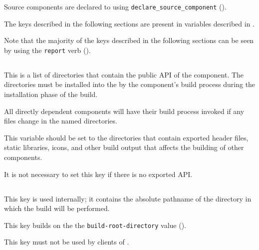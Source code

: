 Source components are declared to \lmsbw using
\texttt{declare\_source\_component}
().

The keys described in the following sections are present in variables
described in .

Note that the majority of the keys described in the following sections
can be seen by using the \texttt{report} verb
().


\subsection{}\label{variables:api}

This is a list of directories that contain the public API of the
component.  The directories must be installed into the \destdir by the
component's build process during the installation phase of the build.

All directly dependent components will have their build process
invoked if any files change in the named directories.

This variable should be set to the directories that contain exported
header files, static libraries, icons, and other build output that
affects the building of other components.

It is not necessary to set this key if there is no exported API.


\subsection{}\label{variables:build-directory}

This key is used internally; it contains the absolute pathname of the
directory in which the build will be performed.

This key builds on the the \texttt{build-root-directory} value
().

This key must not be used by clients of \lmsbw.


\subsection{}\label{variables:build-log}

